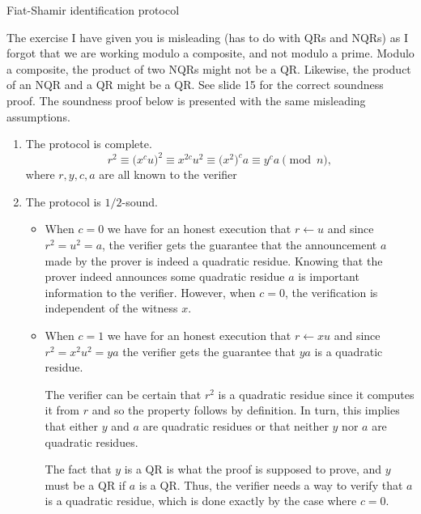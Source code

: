 \documentclass{practice}
\begin{document}
\begin{task}{Fiat-Shamir identification protocol}
  \begin{tcolorbox}[title=Warning!]
    The exercise I have given you is misleading (has to do with QRs and NQRs) as I forgot that we are working modulo a composite, and not modulo a prime.
    Modulo a composite, the product of two NQRs might not be a QR.
    Likewise, the product of an NQR and a QR might be a QR.
    \tcblower
    See slide 15 for the correct soundness proof.
    The soundness proof below is presented with the same misleading assumptions.
  \end{tcolorbox}

  \begin{enumerate}
    \item The protocol is complete.
    \[
      r^2 \equiv \bigl(x^cu\bigr)^2 \equiv x^{2c}u^2 \equiv \bigl(x^2\bigr)^ca \equiv y^ca \pmod{n},
    \]
    where $r, y, c, a$ are all known to the verifier

    \item The protocol is $1/2$-sound.
    
    \begin{itemize}
      \item When $c = 0$ we have for an honest execution that $r \gets u$ and since $r^2 = u^2 = a$, the verifier gets the guarantee that the announcement $a$ made by the prover is indeed a quadratic residue.
      Knowing that the prover indeed announces some quadratic residue $a$ is important information to the verifier.
      However, when $c = 0$, the verification is independent of the witness $x$.
      \item When $c = 1$ we have for an honest execution that $r \gets xu$ and since $r^2 = x^2u^2 = ya$ the verifier gets the guarantee that $ya$ is a quadratic residue.
      
      The verifier can be certain that $r^2$ is a quadratic residue since it computes it from $r$ and so the property follows by definition.
      In turn, this implies that either $y$ and $a$ are quadratic residues or that neither $y$ nor $a$ are quadratic residues\footnotemark{}.

      The fact that $y$ is a QR is what the proof is supposed to prove, and $y$ must be a QR if $a$ is a QR.
      Thus, the verifier needs a way to verify that $a$ is a quadratic residue, which is done exactly by the case where $c = 0$.


\end{itemize}
\end{enumerate}
\end{task}
\end{document}
